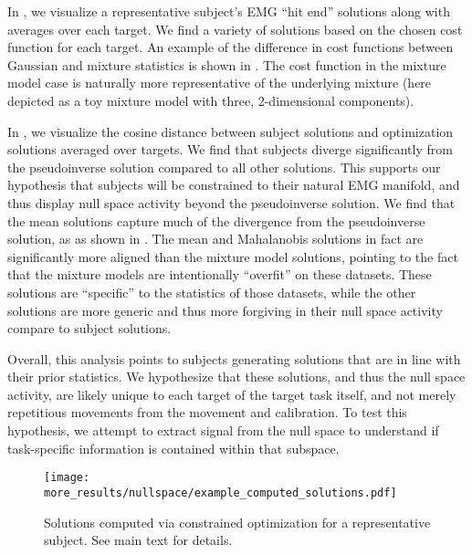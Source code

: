 \documentclass[../main.tex]{subfiles}
\begin{document}
    In , we visualize a representative subject's EMG ``hit end'' solutions along with averages over each target. We find a variety of solutions based on the chosen cost function for each target. An example of the difference in cost functions between Gaussian and mixture statistics is shown in . The cost function in the mixture model case is naturally more representative of the underlying mixture (here depicted as a toy mixture model with three, 2-dimensional components).
    
    In , we visualize the cosine distance between subject solutions and optimization solutions averaged over targets. We find that subjects diverge significantly from the pseudoinverse solution compared to all other solutions. This supports our hypothesis that subjects will be constrained to their natural EMG manifold, and thus display null space activity beyond the pseudoinverse solution. We find that the mean solutions capture much of the divergence from the pseudoinverse solution, as as shown in . The mean and Mahalanobis solutions in fact are significantly more aligned than the mixture model solutions, pointing to the fact that the mixture models are intentionally ``overfit'' on these datasets. These solutions are ``specific'' to the statistics of those datasets, while the other solutions are more generic and thus more forgiving in their null space activity compare to subject solutions. 
    
    Overall, this analysis points to subjects generating solutions that are in line with their prior statistics. We hypothesize that these solutions, and thus the null space activity, are likely unique to each target of the target task itself, and not merely repetitious movements from the movement and calibration. To test this hypothesis, we attempt to extract signal from the null space to understand if task-specific information is contained within that subspace.
  
  
  \begin{figure}[H]%
    \centering
    \texttt{[image: more\_results/nullspace/example\_computed\_solutions.pdf]}
    \caption[Example solutions from constrained optimization]{Solutions computed via constrained optimization for a representative subject. See main text for details.}\label{fig:computed_solutions}
  \end{figure}
  
\end{document}

